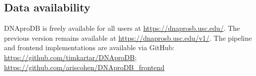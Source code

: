 \subsection{Data availability}
DNAproDB is freely available for all users at \url{https://dnaprosb.usc.edu/}. The previous version remains available at \url{https://dnaprosb.usc.edu/v1/}. 
The pipeline and frontend implementations are available via GitHub:
\url{https://github.com/timkartar/DNAproDB}; 
\url{https://github.com/ariscohen/DNAproDB_frontend}
